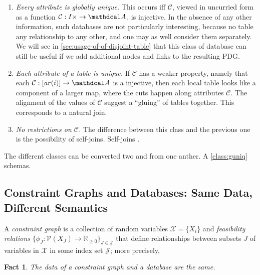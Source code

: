 \documentclass{article}
\theoremstyle{plain}
\newtheorem{fact}[theorem]{Fact}
\theoremstyle{definition}
\theoremstyle{remark}
\newcommand{\Attrs}{\mathdcal A}
\newcommand{\Cols}{\mathcal C}%
\newcommand{\arity}{\mathit{ar}}
\newcommand{\V}{\mathcal V}
\begin{document}
\begin{enumerate}[nosep, label={\textbf{Class \arabic*:}},ref={class \arabic*}]

	\item %
		\textit{Every attribute is globally unique.}
		This occurs iff $\Cols$, viewed in uncurried form as a function $\Cols : I \times \to \Attrs$, is injective. 
		In the absence of any other information, such databases are not particularly interesting, because no table any relationship to any other, and one may as well consider them separately. We will see in \cref{sec:usage-of-of-disjoint-table} that this class of database can still be useful if we add additional nodes and links to the resulting PDG.
		\label{class:guniq}
				
	\item %
		\textit{Each attribute of a table is unique.}
		If $\Cols$ has a weaker property, namely that each $\Cols : [\arity(i)] \to \Attrs$ is a injective, then each local table looks like a component of a larger map, where the cuts happen along attributes $\Cols$. The alignment of the values of $\Cols$ suggest a ``gluing'' of tables together. This corresponds to a natural join. 
		\label{class:luniq}
	\item \textit{No restrictions on $\Cols$.} The difference between this class and the previous one is the possibility of self-joins. Self-joins \cite{DS04}.
		\label{class:nuniq}
\end{enumerate}

	The different classes can be converted two and from one anther. A \ref{class:guniq} schemas.
	
\subsection{Constraint Graphs and Databases: Same Data, Different Semantics}
\begin{defn}
	A \emph{constraint graph}  is a collection of random variables
	$\mathcal X = \{X_i\}$ and  \emph{feasibility relations}
	$\{\phi_J\colon \V(X_J) \to \mathbb R_{\geq0}\}_{J \in
		\mathcal J }$
	that define relationships between subsets $J$ of variables in
	$\mathcal X$ in some index set $\mathcal J$;
	more precisely,
\end{defn}
\begin{fact}
	The data of a constraint graph and a database are the same.
\end{fact}
\end{document}
